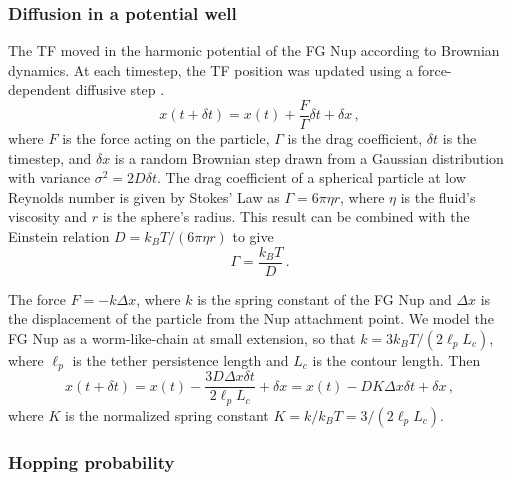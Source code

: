 \subsubsection{Diffusion in a potential well}

The TF moved in the harmonic potential of the FG Nup according to Brownian dynamics. At each timestep, the TF position was updated using a force-dependent diffusive step \cite{blackwell17}.
\begin{equation}
  x(t+\delta t) = x(t) + \frac{F}{\Gamma} \delta t + \delta x\,,
\end{equation} 
where $F$ is the force acting on the particle, $\Gamma$ is the drag coefficient, $\delta t$ is the timestep, and $\delta x$ is a random Brownian step drawn from a Gaussian distribution with variance $\sigma^2 = 2 D \delta t$. The drag coefficient of a spherical particle at low Reynolds number is given by Stokes' Law as $\Gamma = 6 \pi \eta r$, where $\eta$ is the fluid's viscosity and $r$ is the sphere's radius.  This result can be combined with the Einstein relation $D = k_B T / (6\pi \eta r)$ to give
\begin{equation}
\Gamma= \frac{k_B T}{D}\,.
\end{equation}
 
The force $F = -k\Delta x$, where $k$ is the spring constant of the FG Nup and $\Delta x$ is the displacement of the particle from the Nup attachment point.  We model the FG Nup as a worm-like-chain at small extension, so that $k = 3 k_B T/(2\ell_pL_c)$, where $\ell_p$ is the tether persistence length and $L_c$ is the contour length.  Then 
\begin{equation}
  x(t+\delta t) = x(t) - \frac{3 D \Delta x \delta t}{2\ell_p L_c }+
  \delta x = x(t) - D K \Delta x \delta t+ \delta x\,,
\end{equation}
where $K$ is the normalized spring constant $K = k/k_B T = 3/(2 \ell_p L_c)$.

\subsubsection{Hopping probability}

